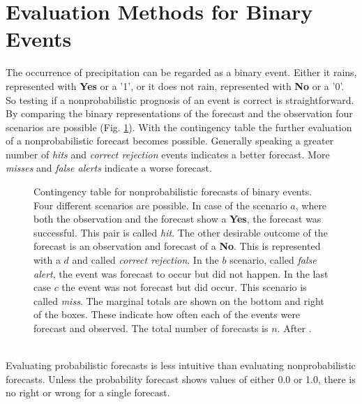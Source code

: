 \documentclass[11pt,twoside,a4paper,fleqn,x11names]{report}
\numberwithin{equation}{chapter}
\numberwithin{figure}{chapter}
\numberwithin{table}{chapter}
\begin{document}
\section{Evaluation Methods for Binary Events}
The occurrence of precipitation can be regarded as a binary event. Either it rains, represented with \textbf{Yes} or a '1', or it does not rain, represented with \textbf{No} or a '0'. So testing if a nonprobabilistic prognosis of an event is correct is straightforward. By comparing the binary representations of the forecast and the observation four scenarios are possible (Fig. \ref{fig:contingency}). With the contingency table the further evaluation of a nonprobabilistic forecast becomes possible. Generally speaking a greater number of \textit{hits} and \textit{correct rejection} events indicates a better forecast. More \textit{misses} and \textit{false alerts} indicate a worse forecast.
\begin{figure}[!htbp]
\centering
	\caption[Contingency Table for Nonprobabilistic Forecasts of Binary Events]{Contingency table for nonprobabilistic forecasts of binary events. Four different scenarios are possible. In case of the scenario $a$, where both the observation and the forecast show a \textbf{Yes}, the forecast was successful. This pair is called \textit{hit}. The other desirable outcome of the forecast is an observation and forecast of a \textbf{No}. This is represented with a $d$ and called \textit{correct rejection}. In the $b$ scenario, called \textit{false alert}, the event was forecast to occur but did not happen. In the last case $c$ the event was not forecast but did occur. This scenario is called \textit{miss}. The marginal totals are shown on the bottom and right of the boxes. These indicate how often each of the events were forecast and observed. The total number of forecasts is $n$. After \cite{Wilks}.}
	\label{fig:contingency}
\end{figure}\\
Evaluating probabilistic forecasts is less intuitive than evaluating nonprobabilistic forecasts. Unless the probability forecast shows values of either 0.0 or 1.0, there is no right or wrong for a single forecast. 
\label{subsec:eval}
\citep{Wilks}
\end{document}
